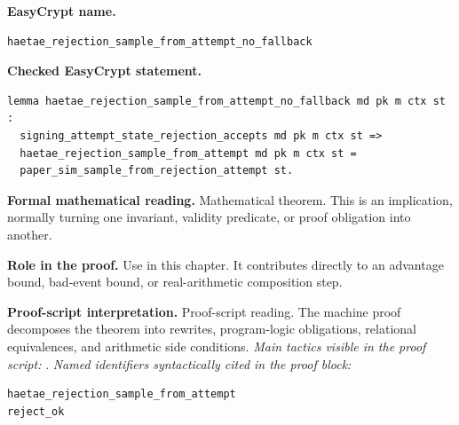 \begin{formaltheorem}
\noindent\textbf{EasyCrypt name.}
\begin{lstlisting}[language=EasyCrypt,basicstyle=\ttfamily\scriptsize]
haetae_rejection_sample_from_attempt_no_fallback
\end{lstlisting}
\noindent\textbf{Checked EasyCrypt statement.}
\begin{lstlisting}[language=EasyCrypt,basicstyle=\ttfamily\scriptsize]
lemma haetae_rejection_sample_from_attempt_no_fallback md pk m ctx st :
  signing_attempt_state_rejection_accepts md pk m ctx st =>
  haetae_rejection_sample_from_attempt md pk m ctx st =
  paper_sim_sample_from_rejection_attempt st.
\end{lstlisting}
\noindent\textbf{Formal mathematical reading.}
Mathematical theorem. This is an implication, normally turning one invariant, validity predicate, or proof obligation into another.

\noindent\textbf{Role in the proof.}
Use in this chapter. It contributes directly to an advantage bound, bad-event bound, or real-arithmetic composition step.

\noindent\textbf{Proof-script interpretation.}
Proof-script reading. The machine proof decomposes the theorem into rewrites, program-logic obligations, relational equivalences, and arithmetic side conditions.
\emph{Main tactics visible in the proof script:} .
\emph{Named identifiers syntactically cited in the proof block:}
\begin{lstlisting}[language=EasyCrypt,basicstyle=\ttfamily\scriptsize]
haetae_rejection_sample_from_attempt
reject_ok
\end{lstlisting}

\end{formaltheorem}

